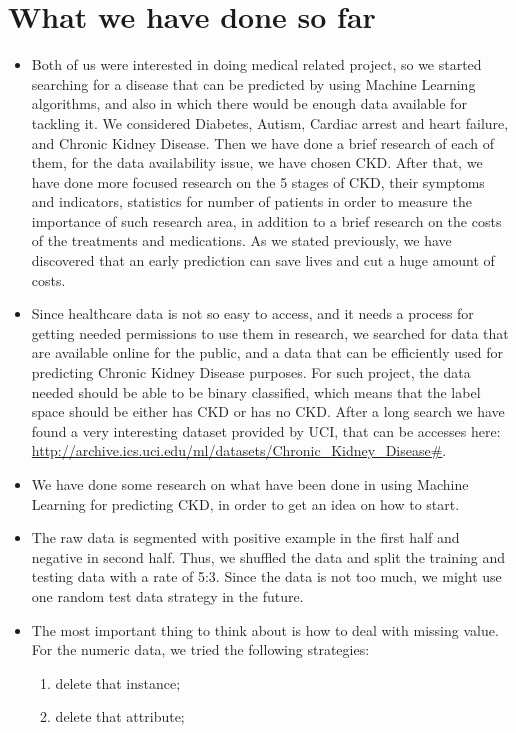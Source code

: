 \documentclass[11pt]{article}
\begin{document}
\section{What we have done so far}
\begin{itemize}
\item Both of us were interested in doing medical related project, so we started searching for a disease that can be predicted by using Machine Learning algorithms, and also in which there would be enough data available for tackling it. We considered Diabetes, Autism, Cardiac arrest and heart failure, and Chronic Kidney Disease. Then we have done a brief research of each of them, for the data availability issue, we have chosen CKD. After that, we have done more focused research on the 5 stages of CKD, their symptoms and indicators, statistics for number of patients in order to measure the importance of such research area, in addition to a brief research on the costs of the treatments and medications. As we stated previously, we have discovered that an early prediction can save lives and cut a huge amount of costs.
\item Since healthcare data is not so easy to access, and it needs a process for getting needed permissions to use them in research, we searched for data that are available online for the public, and a data that can be efficiently used for predicting Chronic Kidney Disease purposes. For such project, the data needed should be able to be binary classified, which means that the label space should be either has CKD or has no CKD. After a long search we have found a very interesting dataset provided by UCI, that can be accesses here:
\url{http://archive.ics.uci.edu/ml/datasets/Chronic_Kidney_Disease#}.
\item We have done some research on what have been done in using Machine Learning for predicting CKD, in order to get an idea on how to start.
\item The raw data is segmented with positive example in the first half and negative in second half. Thus, we shuffled the data and split the training and testing data with a rate of 5:3. Since the data is not too much, we might use one random test data strategy in the future.
\item The most important thing to think about is how to deal with missing value. For the numeric data, we tried the following strategies:
\begin{enumerate}
    \item delete that instance;
    \item delete that attribute;

\end{enumerate}
\end{itemize}
\end{document}
